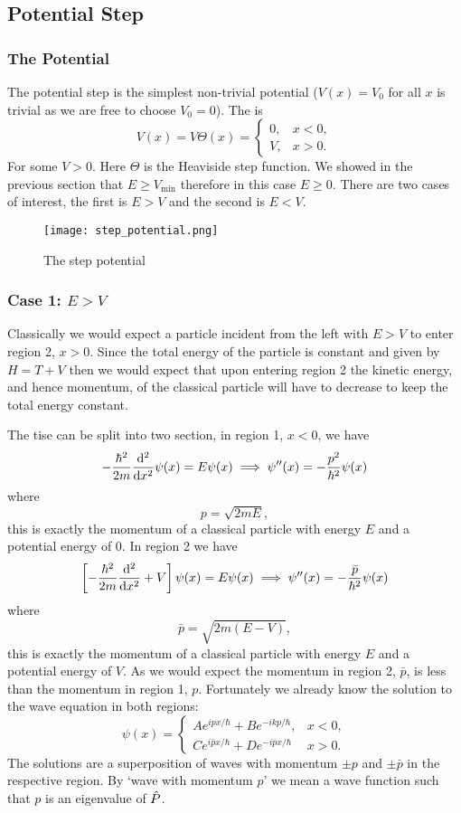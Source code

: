     \subsection{Potential Step}
    \subsubsection{The Potential}
    The potential step is the simplest non-trivial potential (\(V(x) = V_0\) for all \(x\) is trivial as we are free to choose \(V_0 = 0\)).
    The  is
    \[
        V(x) = V\Theta(x) =
        \begin{cases}
            0, & x < 0,\\
            V, & x > 0.
        \end{cases}
    \]
    For some \(V > 0\).
    Here \(\Theta\) is the Heaviside step function.
    We showed in the previous section that \(E \ge V_{\min}\) therefore in this case \(E \ge 0\).
    There are two cases of interest, the first is \(E > V\) and the second is \(E < V\).
    \begin{figure}
        \centering
        \texttt{[image: step\_potential.png]}
        \caption{The step potential}
    \end{figure}
    
    \subsubsection{Case 1: \texorpdfstring{\(E > V\)}{E > V}}
    Classically we would expect a particle incident from the left with \(E > V\) to enter region 2, \(x > 0\).
    Since the total energy of the particle is constant and given by \(H = T + V\) then we would expect that upon entering region 2 the kinetic energy, and hence momentum, of the classical particle will have to decrease to keep the total energy constant.
    
    The \gls{tise} can be split into two section, in region 1, \(x < 0\), we have
    \[-\frac{\hbar^2}{2m}\dv[2]{x}\psi(x) = E\psi(x) \implies \psi''(x) = -\frac{p^2}{\hbar^2}\psi(x)\]
    where
    \[p = \sqrt{2mE},\]
    this is exactly the momentum of a classical particle with energy \(E\) and a potential energy of 0.
    In region 2 we have
    \[\left[-\frac{\hbar^2}{2m}\dv[2]{x}+ V\right]\psi(x) = E\psi(x) \implies \psi''(x) = -\frac{\bar{p}}{\hbar^2}\psi(x)\]
    where
    \[\bar{p} = \sqrt{2m(E - V)},\]
    this is exactly the momentum of a classical particle with energy \(E\) and a potential energy of \(V\).
    As we would expect the momentum in region 2, \(\bar{p}\), is less than the momentum in region 1, \(p\).
    Fortunately we already know the solution to the wave equation in both regions:
    \[
        \psi(x) =
        \begin{cases}
            Ae^{ipx/\hbar} + Be^{-ikp/\hbar}, &x < 0,\\
            Ce^{i\bar{p}x/\hbar} + De^{-i\bar{p}x/\hbar} &x > 0.
        \end{cases}
    \]
    The solutions are a superposition of waves with momentum \(\pm p\) and \(\pm\bar{p}\) in the respective region.
    By `wave with momentum \(p\)' we mean a wave function such that \(p\) is an eigenvalue of \(\hat{P}\).
    
